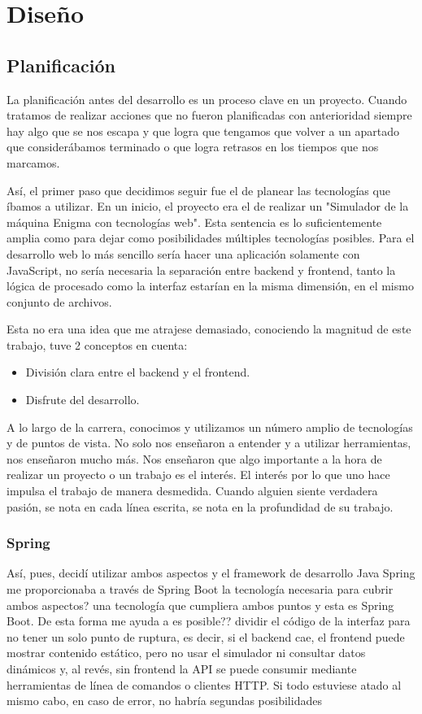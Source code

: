 \chapter{Diseño}



\section {Planificación}
La planificación antes del desarrollo es un proceso clave en un proyecto. Cuando tratamos de realizar acciones que no fueron planificadas con anterioridad siempre hay algo que se nos escapa y que logra que tengamos que volver a un apartado que considerábamos terminado o  que logra retrasos en los tiempos que nos marcamos. 

Así, el primer paso que decidimos seguir fue el de planear las tecnologías que íbamos a utilizar. En un inicio, el proyecto era el de realizar un "Simulador de la máquina Enigma con tecnologías web". Esta sentencia es lo suficientemente amplia como para dejar como posibilidades múltiples tecnologías posibles. Para el desarrollo web lo más sencillo sería hacer una aplicación solamente con JavaScript, no sería necesaria la separación entre backend y frontend, tanto la lógica de procesado como la interfaz estarían en la misma dimensión, en el mismo conjunto de archivos. 

Esta no era una idea que me atrajese demasiado, conociendo la magnitud de este trabajo, tuve 2 conceptos en cuenta: 
\begin{itemize}
	\item División clara entre el backend y el frontend.
	\item Disfrute del desarrollo.
\end{itemize}
A lo largo de la carrera, conocimos y utilizamos un número amplio de tecnologías y de puntos de vista. No solo nos enseñaron a entender y a utilizar herramientas, nos enseñaron mucho más. Nos enseñaron que algo importante a la hora de realizar un proyecto o un trabajo es el interés. El interés por lo que uno hace impulsa el trabajo de manera desmedida. Cuando alguien siente verdadera pasión, se nota en cada línea escrita, se nota en la profundidad de su trabajo. 

\subsection {Spring}

Así, pues, decidí utilizar  ambos aspectos y el framework de desarrollo Java Spring me proporcionaba a través de Spring Boot la tecnología necesaria para cubrir ambos aspectos? una tecnología que cumpliera ambos puntos y esta es Spring Boot. De esta forma me ayuda a es posible?? dividir el código de la interfaz para no tener un solo punto de ruptura, es decir, si el backend cae, el frontend puede mostrar contenido estático, pero no usar el simulador ni consultar datos dinámicos y, al revés, sin frontend la API se puede consumir mediante herramientas de línea de comandos o clientes HTTP. Si todo estuviese atado al mismo cabo, en caso de error, no habría segundas posibilidades

